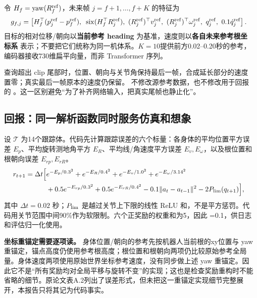 令 $H_f=\operatorname{yaw}(R_f^{\rm ref})$，未来帧 $j=f+1,\ldots,f+K$ 的特征为
\begin{equation}
 g_{f,j}=\left[
 H_f^\top(p_j^{\rm ref}-p_f^{\rm ref}),\ {}
 \operatorname{six}(H_f^\top R_j^{\rm ref}),\ {}
 (R_j^{\rm ref})^\top v_j^{\rm ref},\ {}
 (R_j^{\rm ref})^\top\omega_j^{\rm ref},\ {}
 q_j^{\rm ref},\ 0.1\dot q_j^{\rm ref}
 \right].
\end{equation}
目标的相对位移/朝向以\textbf{当前参考 heading} 为基准，速度则以\textbf{各自未来参考根坐标系} 表示；不要把它们统称为同一机体系。$K=10$提供前方0.02--0.20秒的参考，编码器接收730维扁平向量，而非 Transformer 序列。

查询超出 clip 尾部时，位置、朝向与关节角保持最后一帧，合成延长部分的速度置零；真实最后一帧原本的速度仍保留。 不修改源参考数据，也不修改用于回报的 。这一区别避免“为了补齐网络输入，把真实尾帧也静止化”。

\subsection{回报：同一解析函数同时服务仿真和想象}
设 $\mathcal T$ 为14个跟踪体。代码先计算跟踪误差的六个标量：各身体的平均位置平方误差 $E_p$、平均旋转测地角平方 $E_R$、平均线/角速度平方误差 $E_v,E_\omega$，以及根位置和根朝向误差 $E_{rp},E_{rR}$。
\begin{equation}\label{eq:reward}
\begin{split}
 r_{t+1}=\Delta t\Big[&e^{-E_p/0.3^2}+e^{-E_R/0.4^2}
 +e^{-E_v/1.0^2}+e^{-E_\omega/3.14^2}\\
 &+0.5e^{-E_{rp}/0.3^2}+0.5e^{-E_{rR}/0.4^2}
 -0.1\lVert a_t-a_{t-1}\rVert^2-2P_{\rm lim}(q_{t+1})\Big],
\end{split}
\end{equation}
其中 $\Delta t=0.02$ 秒；$P_{\rm lim}$ 是越过关节上下限的线性 ReLU 和，不是平方惩罚。代码用关节范围中间90\%作为软限制。六个正奖励的权重和为5，因此 =0.1，供日志和评估归一化使用。

\textbf{坐标重锚定需要逐项读。} 身体位置/朝向的参考先按机器人当前根的xy位置与 yaw 重锚定，锚点高度仍使用参考根高度；根位置和根朝向两项仍比较原始参考全局量。身体速度两项使用原始世界坐标参考速度，没有同步做上述 yaw 重锚定。因此它不是“所有奖励均对全局平移与旋转不变”的实现；这也是检查奖励重构时不能省略的细节。原论文表A.2列出了误差形式，但未把这一重锚定实现细节完整展开，本报告只将其记为代码事实。

